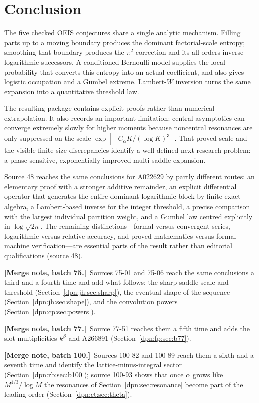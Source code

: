 \documentclass[11pt]{article}
\numberwithin{equation}{section}
\theoremstyle{definition}\newtheorem{definition}[theorem]{Definition}
\theoremstyle{remark}\newtheorem{remark}[theorem]{Remark}
\newcommand{\src}[1]{\textup{(source #1)}}
\newcommand{\mergenoteb}[1]{\par\smallskip\noindent\textbf{[Merge note, batch 75.]}\ #1\par\smallskip}
\newcommand{\mergenotec}[1]{\par\smallskip\noindent\textbf{[Merge note, batch 77.]}\ #1\par\smallskip}
\newcommand{\mergenoted}[1]{\par\smallskip\noindent\textbf{[Merge note, batch 100.]}\ #1\par\smallskip}
\begin{document}
\section{Conclusion}
The five checked OEIS conjectures share a single analytic mechanism. Filling
parts up to a moving boundary produces the dominant factorial-scale entropy;
smoothing that boundary produces the $\pi^2$ correction and its all-orders
inverse-logarithmic successors. A conditioned Bernoulli model supplies the
local probability that converts this entropy into an actual coefficient,
and also gives logistic occupation and a Gumbel extreme. Lambert-$W$
inversion turns the same expansion into a quantitative threshold law.

The resulting package contains explicit proofs rather than numerical
extrapolation. It also records an important limitation: central asymptotics
can converge extremely slowly for higher moments because noncentral
resonances are only suppressed on the scale $\exp[-C_\alpha K/(\log K)^3]$.
That proved scale and the visible finite-size discrepancies identify a
well-defined next research problem: a phase-sensitive, exponentially
improved multi-saddle expansion.

Source 48 reaches the same conclusions for A022629 by partly different routes:
an elementary proof with a stronger additive remainder, an explicit
differential operator that generates the entire dominant logarithmic block by
finite exact algebra, a Lambert-based inverse for the integer threshold, a
precise comparison with the largest individual partition weight, and a Gumbel
law centred explicitly in $\log\sqrt{2n}$.  The remaining
distinctions---formal versus convergent series, logarithmic versus relative
accuracy, and proved mathematics versus formal-machine verification---are
essential parts of the result rather than editorial qualifications
\src{48}.

\mergenoteb{Sources 75-01 and 75-06 reach the same conclusions a third and a
fourth time and add what follows: the sharp saddle scale and threshold
(Section~\ref{dpn:jh:sec:sharp}), the eventual shape of the sequence
(Section~\ref{dpn:jh:sec:shape}), and the convolution powers
(Section~\ref{dpn:cp:sec:powers}).}
\mergenotec{Source 77-51 reaches them a fifth time and adds the slot
multiplicities $k^\beta$ and A266891 (Section~\ref{dpn:fp:sec:b77}).}
\mergenoted{Sources 100-82 and 100-89 reach them a sixth and a seventh time
and identify the lattice-minus-integral sector (Section~\ref{dpn:rb:sec:b100});
source 100-93 shows that once $\alpha$ grows like $M^{1/3}/\log M$ the
resonances of Section~\ref{dpn:sec:resonance} become part of the leading
order (Section~\ref{dpn:ct:sec:theta}).}
\end{document}
